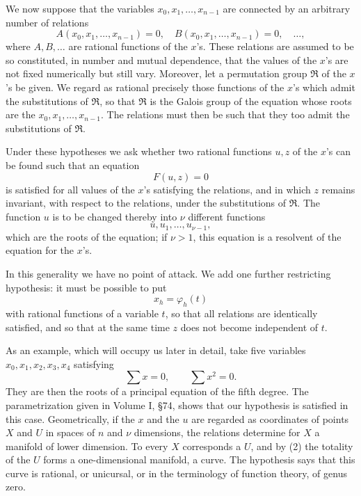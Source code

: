 \documentclass[11pt,a4paper]{book}
\begin{document}
We now suppose that the variables $x_0,x_1,
\ldots,x_{n-1}$ are connected by an arbitrary number of relations
\begin{equation}
 A(x_0,x_1,
\ldots,x_{n-1})=0,
 \quad
 B(x_0,x_1,
\ldots,x_{n-1})=0,
 \quad\ldots,
\end{equation}
where $A,B,
\ldots$ are rational functions of the $x$'s.  These relations are assumed to be so constituted, in number and mutual dependence, that the values of the $x$'s are not fixed numerically but still vary.  Moreover, let a permutation group $\mathfrak R$ of the $x$'s be given.  We regard as rational precisely those functions of the $x$'s which admit the substitutions of $\mathfrak R$, so that $\mathfrak R$ is the Galois group of the equation whose roots are the $x_0,x_1,
\ldots,x_{n-1}$.  The relations must then be such that they too admit the substitutions of $\mathfrak R$.

Under these hypotheses we ask whether two rational functions $u,z$ of the $x$'s can be found such that an equation
\begin{equation}
 F(u,z)=0
\end{equation}
is satisfied for all values of the $x$'s satisfying the relations, and in which $z$ remains invariant, with respect to the relations, under the substitutions of $\mathfrak R$.  The function $u$ is to be changed thereby into $\nu$ different functions
\[
 u,u_1,
\ldots,u_{\nu-1},
\]
which are the roots of the equation; if $\nu>1$, this equation is a resolvent of the equation for the $x$'s.

In this generality we have no point of attack.  We add one further restricting hypothesis: it must be possible to put
\begin{equation}
 x_h=\varphi_h(t)
\end{equation}
with rational functions of a variable $t$, so that all relations are identically satisfied, and so that at the same time $z$ does not become independent of $t$.

As an example, which will occupy us later in detail, take five variables $x_0,x_1,x_2,x_3,x_4$ satisfying
\begin{equation}
 \sum x=0,
 \qquad
 \sum x^2=0.
\end{equation}
They are then the roots of a principal equation of the fifth degree.  The parametrization given in Volume I, \S 74, shows that our hypothesis is satisfied in this case.  Geometrically, if the $x$ and the $u$ are regarded as coordinates of points $X$ and $U$ in spaces of $n$ and $\nu$ dimensions, the relations determine for $X$ a manifold of lower dimension.  To every $X$ corresponds a $U$, and by (2) the totality of the $U$ forms a one-dimensional manifold, a curve.  The hypothesis says that this curve is rational, or unicursal, or in the terminology of function theory, of genus zero.
\end{document}
